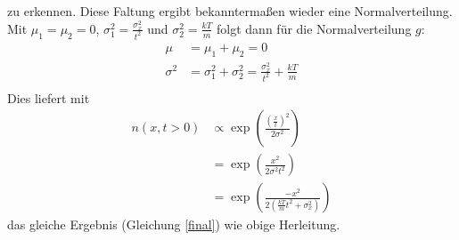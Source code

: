 \documentclass[10pt,a4paper]{extarticle}
\begin{document}
zu erkennen.
Diese Faltung ergibt bekanntermaßen wieder eine Normalverteilung.
Mit $\mu_1 = \mu_2 = 0$, $\sigma_1^2 = \frac{\sigma_x^2}{t^2}$ und $\sigma_2^2 = \frac{kT}{m}$ folgt dann für die Normalverteilung $g$:
\begin{align}
\mu &= \mu_1 + \mu_2 = 0 \\
\sigma^2 &= \sigma_1^2 + \sigma_2^2 =  \frac{\sigma_x^2}{t^2} + \frac{kT}{m}\\
\end{align}
Dies liefert mit 
\begin{align}
n(x, t> 0) &\varpropto \exp\left(\frac{\left(\frac{x}{t}\right)^2}{2 \sigma^2}\right) \\
&= \exp\left(\frac{x^2}{2 \sigma^2 t^2}\right) \\
&= \exp\left(\frac{- x^2 }{2\left(\frac{kT}{m}t^2 + \sigma_x^2\right)}\right) 
\end{align}
das gleiche Ergebnis (Gleichung \eqref{final}) wie obige Herleitung.
\end{document}
